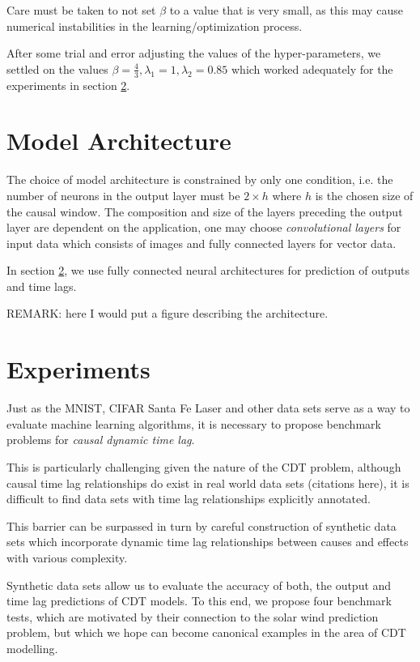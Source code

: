 \documentclass[twoside]{article}
\begin{document}
Care must be taken to not set $\beta$ to a value that is very small, as this may cause numerical instabilities in the learning/optimization process. 

After some trial and error adjusting the values of the hyper-parameters, we settled on the values $\beta = \frac{4}{3}, \lambda_1 = 1, \lambda_2 = 0.85$ which worked adequately for the experiments in section \ref{sec:exp}.

\section{Model Architecture}

The choice of model architecture is constrained by only one condition, i.e. the number of neurons in the output layer must be $2 \times h$ where $h$ is the chosen size of the causal window. The composition and size of the layers preceding the output layer are dependent on the application, one may choose \emph{convolutional layers} for input data which consists of images and fully connected layers for vector data.

In section \ref{sec:exp}, we use fully connected neural architectures for prediction of outputs and time lags.

REMARK: here I would put a figure describing the architecture.

\section{Experiments}\label{sec:exp}


Just as the MNIST, CIFAR Santa Fe Laser and other data sets serve as a way to evaluate machine learning
algorithms, it is necessary to propose benchmark problems for \emph{causal dynamic time lag}.

This is particularly challenging given the nature of the CDT problem, although causal time lag
relationships do exist in real world data sets (citations here), it is difficult to find data sets
with time lag relationships explicitly annotated.

This barrier can be surpassed in turn by careful construction of synthetic data sets which incorporate dynamic time lag relationships between causes and effects with various complexity.

Synthetic data sets allow us to evaluate the accuracy of both, the output and time lag predictions of CDT models. To this end, we propose four benchmark tests, which are motivated by their connection to the solar wind prediction problem, but which we hope can become canonical examples in the area of CDT modelling.
\end{document}

